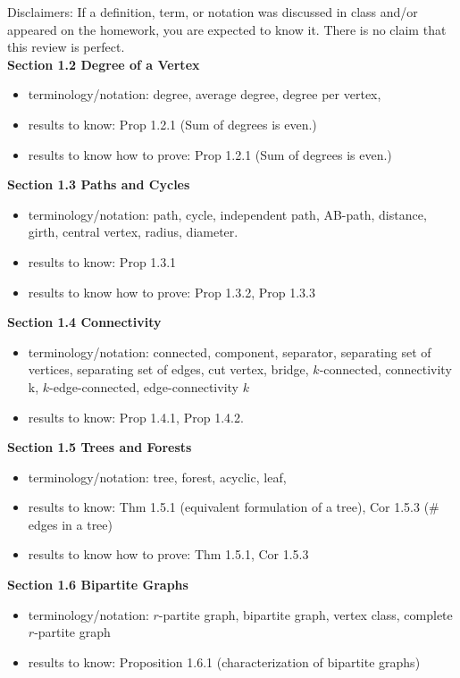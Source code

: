 \documentclass[12pt]{article}
\begin{document}
Disclaimers: If a definition, term, or notation was discussed in class and/or appeared on the homework, you are expected to know it. There is no claim that this review is perfect.\\

\noindent \textbf{Section 1.2 Degree of a Vertex}
	\begin{itemize}
	\item terminology/notation: degree, average degree, degree per vertex, 
	\item results to know: Prop 1.2.1 (Sum of degrees is even.) 
	\item results to know how to prove: Prop 1.2.1 (Sum of degrees is even.) 
	\end{itemize}
\noindent \textbf{Section 1.3 Paths and Cycles}
	\begin{itemize}
	\item terminology/notation: path, cycle, independent path, AB-path, distance, girth, central vertex, radius, diameter.
	\item results to know: Prop 1.3.1
	\item results to know how to prove: Prop 1.3.2, Prop 1.3.3 
	\end{itemize}
\noindent \textbf{Section 1.4 Connectivity}
	\begin{itemize}
	\item terminology/notation: connected, component, separator, separating set of vertices, separating set of edges, cut vertex, bridge, $k$-connected, connectivity k, $k$-edge-connected, edge-connectivity $k$
	\item results to know: Prop 1.4.1, Prop 1.4.2.
	\end{itemize}
\noindent \textbf{Section 1.5 Trees and Forests}
	\begin{itemize}
	\item terminology/notation: tree, forest, acyclic, leaf,
	\item results to know: Thm 1.5.1 (equivalent formulation of a tree), Cor 1.5.3 (\# edges in a tree)
	\item results to know how to prove: Thm 1.5.1, Cor 1.5.3
	\end{itemize}
\noindent \textbf{Section 1.6 Bipartite Graphs}
	\begin{itemize}
	\item terminology/notation: $r$-partite graph, bipartite graph, vertex class, complete $r$-partite graph
	\item results to know: Proposition 1.6.1 (characterization of bipartite graphs)
	\end{itemize}
\end{document}
